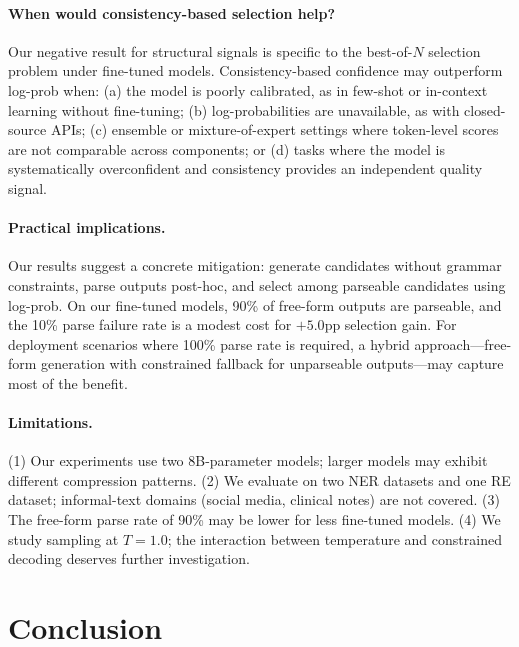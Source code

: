 \documentclass[11pt,a4paper]{article}
\begin{document}
\paragraph{When would consistency-based selection help?}
Our negative result for structural signals is specific to the best-of-$N$ selection problem under fine-tuned models. Consistency-based confidence may outperform log-prob when: (a) the model is poorly calibrated, as in few-shot or in-context learning without fine-tuning; (b) log-probabilities are unavailable, as with closed-source APIs; (c) ensemble or mixture-of-expert settings where token-level scores are not comparable across components; or (d) tasks where the model is systematically overconfident and consistency provides an independent quality signal.

\paragraph{Practical implications.}
Our results suggest a concrete mitigation: generate candidates without grammar constraints, parse outputs post-hoc, and select among parseable candidates using log-prob. On our fine-tuned models, 90\% of free-form outputs are parseable, and the 10\% parse failure rate is a modest cost for $+5.0$pp selection gain. For deployment scenarios where 100\% parse rate is required, a hybrid approach---free-form generation with constrained fallback for unparseable outputs---may capture most of the benefit.

\paragraph{Limitations.}
(1) Our experiments use two 8B-parameter models; larger models may exhibit different compression patterns. (2) We evaluate on two NER datasets and one RE dataset; informal-text domains (social media, clinical notes) are not covered. (3) The free-form parse rate of 90\% may be lower for less fine-tuned models. (4) We study sampling at $T = 1.0$; the interaction between temperature and constrained decoding deserves further investigation.

\section{Conclusion}
\end{document}

